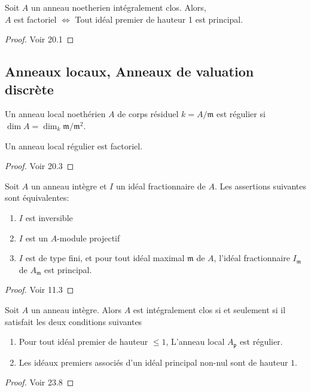 \begin{thm}\label{UFDPID}
Soit $A$ un anneau noetherien intégralement clos. Alors, \\
$A$ est factoriel $\iff$ Tout idéal premier de hauteur 1 est principal.
\end{thm}
\begin{proof}
Voir \cite{Matsumura} 20.1
\end{proof}

\subsection{Anneaux locaux, Anneaux de valuation discrète}

\begin{defn}
Un anneau local noethérien $A$ de corps résiduel $k=A/\mathfrak{m}$ est régulier si $\dim A =\dim_k\mathfrak{m}/\mathfrak{m}^2$.
\end{defn}

\begin{thm}\label{reglocufd}
Un anneau local régulier est factoriel.
\end{thm}
\begin{proof}
Voir \cite{Matsumura} 20.3
\end{proof}

\begin{thm}\label{ideauxinversibles}
Soit $A$ un anneau intègre et $I$ un idéal fractionnaire de $A$. Les assertions suivantes sont équivalentes:
\begin{enumerate}
\item $I$ est inversible
\item $I$ est un $A$-module projectif
\item $I$ est de type fini, et pour tout idéal maximal $\mathfrak{m}$ de $A$, l'idéal fractionnaire $I_\mathfrak{m}$ de $A_\mathfrak{m}$ est principal.
\end{enumerate}
\end{thm}
\begin{proof}
Voir \cite{Matsumura} 11.3
\end{proof}

\begin{thm}\label{SerreCritere}
Soit $A$ un anneau intègre. Alors $A$ est intégralement clos si et seulement si il satisfait les deux conditions suivantes
\begin{enumerate}
\item Pour tout idéal premier de hauteur $\leq 1$, L'anneau local $A_\mathfrak{p}$ est régulier.
\item Les idéaux premiers associés d'un idéal principal non-nul sont de hauteur $1$.
\end{enumerate}
\end{thm}
\begin{proof}
Voir \cite{Matsumura} 23.8
\end{proof}

